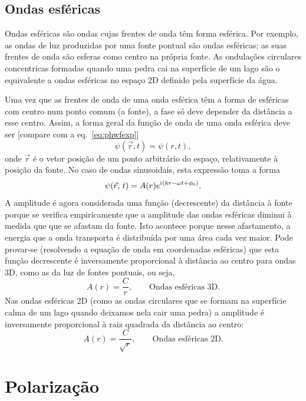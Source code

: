 \subsection{Ondas esféricas}
Ondas esféricas são ondas cujas frentes de onda têm forma esférica. Por exemplo,
as ondas de luz produzidas por uma fonte pontual são ondas esféricas; as suas
frentes de onda são esferas como centro na própria fonte. As ondulações
circulares concentricas formadas quando uma pedra cai na superfície de um lago
são o equivalente a ondas esféricas no espaço 2D definido pela superfície da
água.

Uma vez que as frentes de onda de uma onda esférica têm a forma de esféricas
com centro num ponto comum (a fonte), a fase só deve depender da distância a
esse centro. Assim, a forma geral da função de onda de uma onda
esférica deve ser [compare com a eq.~\eqref{eq:phwfexp}]
\begin{equation*}
\psi(\vec r,t)=\psi(r,t),
\end{equation*}
onde $\vec r$ é o vetor posição de um ponto arbitrário do espaço, relativamente
à posição da fonte. No caso de ondas sinusoidais, esta expressão toma a forma
\begin{equation}
\psi(\vec r,\,t)=A(r)e^{\iu(kr-\omega t+\phi_0)}.
\end{equation}
A amplitude é agora considerada uma função (decrescente) da distância à fonte
porque se verifica empiricamente que a amplitude das ondas esféricas diminui à
medida que que se afastam da fonte. Isto acontece porque nesse afastamento, a
energia que a onda transporta é distribuída por uma área cada vez maior. Pode
provar-se (resolvendo a equação de onda em coordenadas esféricas) que esta
função decrescente é inversamente proporcional à distância ao centro para ondas
3D, como as da luz de fontes pontuais, ou seja,
\begin{equation*}
A(r)=\frac{C}{r},\qquad\text{Ondas esféricas 3D.}
\end{equation*}
Nas ondas esféricas 2D (como as ondas circulares que se formam na superfície
calma de um lago quando deixamos nela cair uma pedra) a amplitude é inversamente
proporcional à raiz quadrada da distância ao centro:
\begin{equation*}
A(r)=\frac{C}{\sqrt r},\qquad\text{Ondas esféricas 2D.}
\end{equation*}

\section{Polarização}
\tobedone{}

